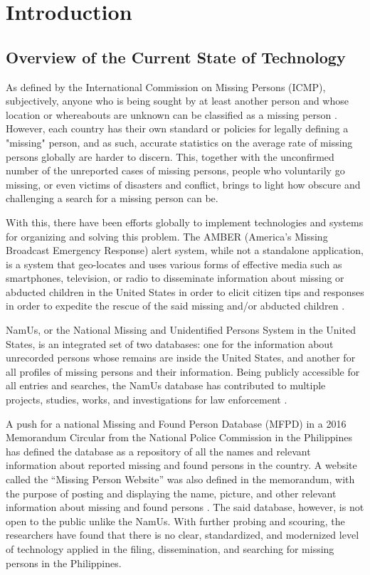 \chapter{Introduction}
\label{sec:researchdesc}    %

\section{Overview of the Current State of Technology}
\label{sec:overview}
As defined by the International Commission on Missing Persons (ICMP), subjectively, anyone who is being sought by at least another person and whose location or whereabouts are unknown can be classified as a missing person \cite{icmpMissing}. However, each country has their own standard or policies for legally defining a "missing" person, and as such, accurate statistics on the average rate of missing persons globally are harder to discern. This, together with the unconfirmed number of the unreported cases of missing persons, people who voluntarily go missing, or even victims of disasters and conflict, brings to light how obscure and challenging a search for a missing person can be.

With this, there have been efforts globally to implement technologies and systems for organizing and solving this problem. The AMBER (America's Missing Broadcast Emergency Response) alert system, while not a standalone application, is a system that geo-locates and uses various forms of effective media such as smartphones, television, or radio to disseminate information about missing or abducted children in the United States in order to elicit citizen tips and responses in order to expedite the rescue of the said missing and/or abducted children \cite{griffin2007preliminary}.

NamUs, or the National Missing and Unidentified Persons System in the United States, is an integrated set of two databases: one for the information about unrecorded persons whose remains are inside the United States, and another for all profiles of missing persons and their information. Being publicly accessible for all entries and searches, the NamUs database has contributed to multiple projects, studies, works, and investigations for law enforcement \cite{murray2018history}. 

A push for a national Missing and Found Person Database (MFPD) in a 2016 Memorandum Circular from the National Police Commission in the Philippines has defined the database as a repository of all the names and relevant information about reported missing and found persons in the country. A website called the “Missing Person Website” was also defined in the memorandum, with the purpose of posting and displaying the name, picture, and other relevant information about missing and found persons \cite{NationalPoliceCommission}. The said database, however, is not open to the public unlike the NamUs. With further probing and scouring, the researchers have found that there is no clear, standardized, and modernized level of technology applied in the filing, dissemination, and searching for missing persons in the Philippines.


